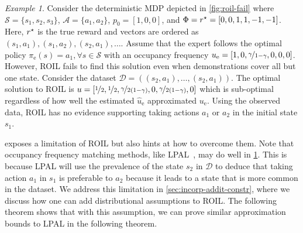 \documentclass[10pt]{article}
\renewcommand{\cite}{\citep}
\theoremstyle{plain}
\theoremstyle{remark}
\newtheorem{example}{Example}
\begin{document}
\begin{example} \label{exm:roil-limitations}
Consider the deterministic MDP depicted in \cref{fig:roil-fail} where $\mathcal{S} = \{s_1, s_2, s_3\}$, $\mathcal{A} = \{a_1, a_2\}$, $p_0 = [1,0,0]$, and $\Phi = r^{\mathnormal{\star}} = [0,0,1,1,-1,-1]$. Here, $r^{\mathnormal{\star}}$ is the true reward and vectors are ordered as $(s_1,a_1), (s_1, a_2), (s_2,a_1), \dots $. Assume that the expert follows the optimal policy $\pi_{\mathrm{e}}(s) = a_1, \forall s\in \mathcal{S}$ with an occupancy frequency $u_{\mathrm{e}} = [1,0,\nicefrac{\gamma}{1-\gamma},0,0,0]$. However, ROIL fails to find this solution even when demonstrations cover all but one state. Consider the dataset $\mathcal{D} = ((s_2, a_1),  \dots, (s_2, a_1))$. The optimal solution to ROIL is $u = [\nicefrac{1}{2},\nicefrac{1}{2},\nicefrac{\gamma}{2(1-\gamma)},0,\nicefrac{\gamma}{2(1-\gamma)},0]$ which is sub-optimal regardless of how well the estimated $\hat{u}_{\mathrm{e}}$ approximated $u_{\mathrm{e}}$. Using the observed data, ROIL has no evidence supporting taking actions $a_1$ or $a_2 $ in the initial state $s_1$.
\end{example} 

 exposes a limitation of ROIL but also hints at how to overcome them. Note that occupancy frequency matching methods, like LPAL~\cite{Syed2008}, may do well in \cref{exm:roil-limitations}. This is because LPAL will use the prevalence of the state $s_2$ in $\mathcal{D}$ to deduce that taking action $a_1$ in $s_1$ is preferable to $a_2$ because it leads to a state that is more common in the dataset. We address this limitation in \cref{sec:incorp-addit-constr}, where we discuss how one can add distributional assumptions to ROIL. The following theorem shows that with this assumption, we can prove similar approximation bounds to LPAL in the following theorem. 
\end{document}
